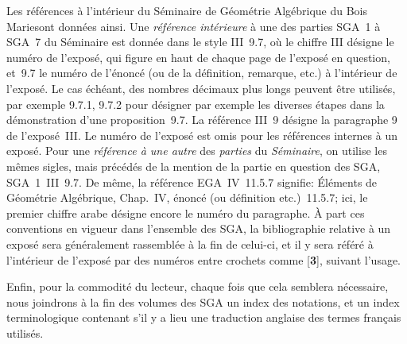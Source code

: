 Les r\'ef\'erences \`a l'int\'erieur du \og S\'eminaire de
G\'eom\'etrie Alg\'ebrique du
Bois Marie\fg sont donn\'ees
ainsi. Une \emph{référence intérieure} \`a une des
parties SGA~1 \`a SGA~7 du S\'eminaire est donn\'ee dans le
style III~9.7, o\`u le chiffre III d\'esigne le num\'ero de
l'expos\'e, qui figure en haut de chaque page de l'expos\'e en
question, et~9.7 le num\'ero de l'\'enonc\'e (ou de la
d\'efinition, remarque, etc.) \`a l'int\'erieur de
l'expos\'e. Le cas \'ech\'eant, des nombres d\'ecimaux plus
longs peuvent \^etre utilis\'es, par exemple 9.7.1, 9.7.2 pour
d\'esigner par exemple les diverses \'etapes dans la
d\'emonstration d'une proposition~9.7. La r\'ef\'erence III~9
d\'esigne la paragraphe 9 de l'expos\'e~III. Le num\'ero de
l'expos\'e est omis pour les r\'ef\'erences internes \`a un
expos\'e. Pour une \emph{référence à une autre} des
\emph{parties} du \emph{Séminaire}, on utilise les m\^emes
sigles, mais pr\'ec\'ed\'es de la mention de la partie en
question des SGA, SGA~1~III~9.7. De m\^eme, la r\'ef\'erence
EGA~IV~11.5.7 signifie: \'El\'ements de G\'eom\'etrie
Alg\'ebrique, Chap.\, IV, \'enonc\'e (ou d\'efinition
etc.)~11.5.7; ici, le premier chiffre arabe d\'esigne encore le
num\'ero du paragraphe. \`A part ces conventions en vigueur dans
l'ensemble des SGA, la bibliographie relative \`a un expos\'e sera
g\'en\'eralement rassembl\'ee \`a la fin de celui-ci, et il y
sera r\'ef\'er\'e \`a l'int\'erieur de l'expos\'e par des
num\'eros entre crochets comme
[\textbf{3}], suivant l'usage.

Enfin, pour la commodit\'e du lecteur, chaque fois que cela semblera
n\'ecessaire, nous joindrons \`a la fin des volumes des SGA un
index des notations, et un index terminologique contenant s'il y a
lieu une traduction anglaise des termes fran\c cais utilis\'es.

